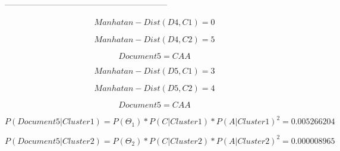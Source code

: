 \begin{boxD}
-----------------------------------------------------------


    \begin{equation*}
        Manhatan-Dist(D4 , C1) = 0
    \end{equation*}

    \begin{equation*}
        Manhatan-Dist(D4 , C2) = 5
    \end{equation*}

    \begin{center}
        \color{red}
    \end{center}
    
\end{boxD}

\begin{boxK}
    \begin{center}
    \end{center}

    \begin{equation*}
        Document5 = C A A
    \end{equation*}

    \begin{equation*}
        Manhatan-Dist(D5 , C1) = 3
    \end{equation*}

     \begin{equation*}
        Manhatan-Dist(D5 , C2) = 4
    \end{equation*}

    \begin{center}
    \color{red}
    \end{center}



\end{boxK}

\begin{boxK}
    \begin{center}
    \end{center}

    \begin{equation*}
        Document5 = C A A
    \end{equation*}

    \begin{equation*}
        P(Document5 | Cluster1) = P(\Theta_{1}) * P(C | Cluster1) * P(A | Cluster1) ^ 2 = 0.005266204
    \end{equation*}

    \begin{equation*}
        P(Document5 | Cluster2) = P(\Theta_{2}) * P(C | Cluster2) * P(A | Cluster2) ^ 2 = 0.000008965
    \end{equation*}

    \begin{center}
    \color{red}
    \end{center}
\end{boxK}

